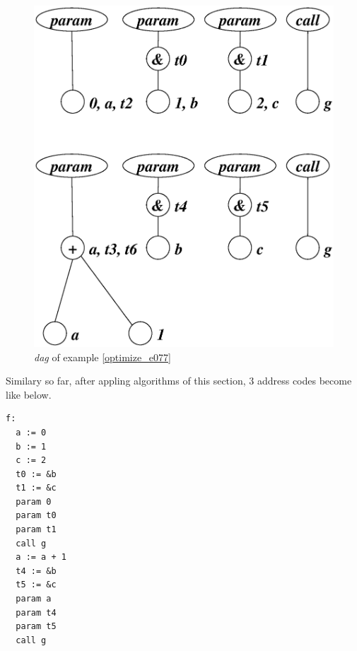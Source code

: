 \begin{Example}
\begin{figure}[htbp]
\begin{center}
\begin{latexonly}
\includegraphics[width=1.0\linewidth,height=0.894\linewidth]{opt032.eps}
\end{latexonly}
\caption{{\em dag} of example \ref{optimize_e077}}
\label{optimize_e078}
\end{center}
\end{figure}
Similary so far,
after appling algorithms of this section,
3 address codes become like below.
\begin{verbatim}
f:
  a := 0
  b := 1
  c := 2
  t0 := &b
  t1 := &c
  param 0
  param t0
  param t1
  call g
  a := a + 1
  t4 := &b
  t5 := &c
  param a
  param t4
  param t5
  call g
\end{verbatim}
\end{Example}

